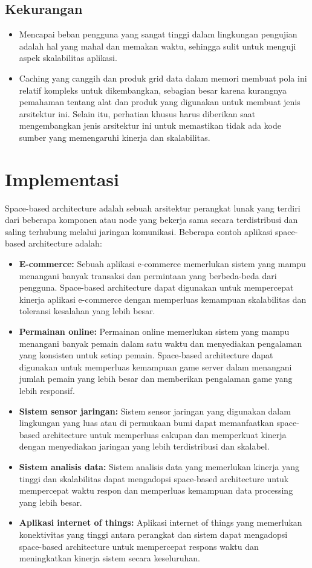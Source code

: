 \documentclass[a4paper]{report}
\begin{document}
	\subsection*{\LARGE{Kekurangan}}
	\begin{itemize}
		\item \large Mencapai beban pengguna yang sangat tinggi dalam lingkungan pengujian adalah hal yang mahal dan memakan waktu, sehingga sulit untuk menguji aspek skalabilitas aplikasi.
		\item \large Caching yang canggih dan produk grid data dalam memori membuat pola ini relatif kompleks untuk dikembangkan, sebagian besar karena kurangnya pemahaman tentang alat dan produk yang digunakan untuk membuat jenis arsitektur ini. Selain itu, perhatian khusus harus diberikan saat mengembangkan jenis arsitektur ini untuk memastikan tidak ada kode sumber yang memengaruhi kinerja dan skalabilitas.
	\end{itemize}
	\section*{\huge{Implementasi}}
	\large Space-based architecture adalah sebuah arsitektur perangkat lunak yang terdiri dari beberapa komponen atau node yang bekerja sama secara terdistribusi dan saling terhubung melalui jaringan komunikasi. Beberapa contoh aplikasi space-based architecture adalah:
	\begin{itemize}
		\item \large {\textbf{E-commerce:}} Sebuah aplikasi e-commerce memerlukan sistem yang mampu menangani banyak transaksi dan permintaan yang berbeda-beda dari pengguna. Space-based architecture dapat digunakan untuk mempercepat kinerja aplikasi e-commerce dengan memperluas kemampuan skalabilitas dan toleransi kesalahan yang lebih besar.
		\item \large {\textbf{Permainan online:}} Permainan online memerlukan sistem yang mampu menangani banyak pemain dalam satu waktu dan menyediakan pengalaman yang konsisten untuk setiap pemain. Space-based architecture dapat digunakan untuk memperluas kemampuan game server dalam menangani jumlah pemain yang lebih besar dan memberikan pengalaman game yang lebih responsif.
		\item \large {\textbf{Sistem sensor jaringan:}} Sistem sensor jaringan yang digunakan dalam lingkungan yang luas atau di permukaan bumi dapat memanfaatkan space-based architecture untuk memperluas cakupan dan memperkuat kinerja dengan menyediakan jaringan yang lebih terdistribusi dan skalabel.
		\item \large {\textbf{Sistem analisis data:}} Sistem analisis data yang memerlukan kinerja yang tinggi dan skalabilitas dapat mengadopsi space-based architecture untuk mempercepat waktu respon dan memperluas kemampuan data processing yang lebih besar.
		\item \large {\textbf{Aplikasi internet of things:}} Aplikasi internet of things yang memerlukan konektivitas yang tinggi antara perangkat dan sistem dapat mengadopsi space-based architecture untuk mempercepat respons waktu dan meningkatkan kinerja sistem secara keseluruhan.
	\end{itemize}
\end{document}
